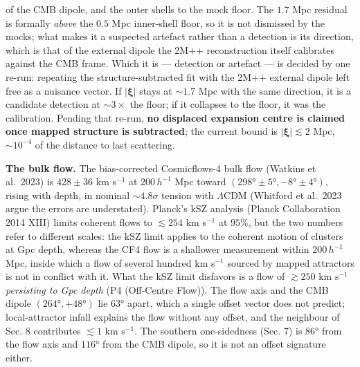 \documentclass[
]{article}
\begin{document}
of the CMB dipole, and the outer shells to the mock floor. The \(1.7\)
Mpc residual is formally \emph{above} the \(0.5\) Mpc inner-shell floor,
so it is not dismissed by the mocks; what makes it a suspected artefact
rather than a detection is its direction, which is that of the external
dipole the 2M++ reconstruction itself calibrates against the CMB frame.
Which it is --- detection or artefact --- is decided by one re-run:
repeating the structure-subtracted fit with the 2M++ external dipole
left free as a nuisance vector. If \(|\boldsymbol{\xi}|\) stays at
\(\sim\!1.7\) Mpc with the same direction, it is a candidate detection
at \(\sim\!3\times\) the floor; if it collapses to the floor, it was the
calibration. Pending that re-run, \textbf{no displaced expansion centre
is claimed once mapped structure is subtracted}; the current bound is
\(|\boldsymbol{\xi}| \lesssim 2\) Mpc, \(\sim\!10^{-4}\) of the distance
to last scattering.

\textbf{The bulk flow.} The bias-corrected Cosmicflows-4 bulk flow
(Watkins et al.~2023) is \(428 \pm 36\) km s\(^{-1}\) at \(200\,h^{-1}\)
Mpc toward \((298° \pm 5°, -8° \pm 4°)\), rising with depth, in nominal
\(\sim\!4.8\sigma\) tension with \(\Lambda\)CDM (Whitford et al.~2023
argue the errors are understated). Planck's kSZ analysis (Planck
Collaboration 2014 XIII) limits coherent flows to \(\lesssim 254\) km
s\(^{-1}\) at \(95\%\), but the two numbers refer to different scales:
the kSZ limit applies to the coherent motion of clusters at Gpc depth,
whereas the CF4 flow is a shallower measurement within \(200\,h^{-1}\)
Mpc, inside which a flow of several hundred km s\(^{-1}\) sourced by
mapped attractors is not in conflict with it. What the kSZ limit
disfavors is a flow of \(\gtrsim 250\) km s\(^{-1}\) \emph{persisting to
Gpc depth} (P4 (Off-Centre Flow)). The flow axis and the CMB dipole
\((264°, +48°)\) lie \(63°\) apart, which a single offset vector does
not predict; local-attractor infall explains the flow without any
offset, and the neighbour of Sec. 8 contributes \(\lesssim 1\) km
s\(^{-1}\). The southern one-sidedness (Sec. 7) is \(86°\) from the flow
axis and \(116°\) from the CMB dipole, so it is not an offset signature
either.
\end{document}
